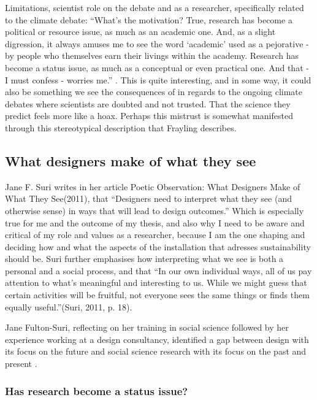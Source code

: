Limitations, scientist role on the debate and as a researcher, specifically related to the climate debate:
“What’s the motivation? True, research has become a political or resource issue, as much as an academic one. And, as a slight digression, it always amuses me to see the word ‘academic’ used as a pejorative - by people who themselves earn their livings within the academy. Research has become a status issue, as much as a conceptual or even practical one. And that - I must confess - worries me.” \autocite[p. 5]{frayling_1994}. This is quite interesting, and in some way, it could also be something we see the consequences of in regards to the ongoing climate debates where scientists are doubted and not trusted. That the science they predict feels more like a hoax. Perhaps this mistrust is somewhat manifested through this stereotypical description that Frayling describes.

\subsection{What designers make of what they see}
Jane F. Suri writes in her article Poetic Observation: What Designers Make of What They See(2011), that “Designers need to interpret what they see (and otherwise sense) in ways that will lead to design outcomes.” Which is especially true for me and the outcome of my thesis, and also why I need to be aware and critical of my role and values as a researcher, because  I am the one shaping and deciding how and what the aspects of the installation that adresses sustainability should be. Suri further emphasises how interpreting what we see is both a personal and a social process, and that “In our own individual ways, all of us pay attention to what’s meaningful and interesting to us. While we might guess that certain activities will be fruitful, not everyone sees the same things or finds them equally useful.”(Suri, 2011, p. 18).

Jane Fulton-Suri, reflecting on her training in social science followed by her experience working at a design consultancy, identified a gap between design with its focus on the future and social science research with its focus on the past and present \autocite[p. 167]{zimmerman_research_2014}.

\subsubsection{Has research become a status issue?}

